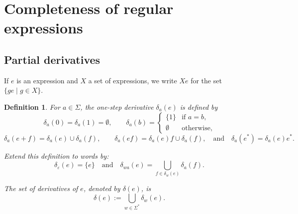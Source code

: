 \documentclass{article}
\newtheorem{definition}{Definition}[section]
\begin{document}
  


\section{Completeness of regular expressions}

\subsection{Partial derivatives}
\begin{notation}
If $e$ is an expression and $X$ a set of expressions, we write $Xe$ for the set $\{ge\mid g\in X\}$.
\end{notation}
 


\begin{definition}
  For $a\in\Sigma$, the one-step derivative $\delta_a(e)$ is defined by
  \[
  \delta_a(0)=\delta_a(1)=\emptyset,\qquad
  \delta_a(b)=
  \begin{cases}
    \{1\} & \text{if }a=b,\\
    \emptyset & \text{otherwise},
  \end{cases}
  \]
  \[
  \delta_a(e+f)=\delta_a(e)\cup\delta_a(f),\qquad
  \delta_a(ef)=\delta_a(e)f\cup \delta_a(f),\quad \text{and} \quad \delta_a(e^*)=\delta_a(e)e^*.
  \]

  \medskip
  Extend this definition to words by:
  \[ \delta_\varepsilon(e)=\{e\} \quad \text{and} \quad
    \delta_{wa}(e)=\bigcup_{f\in\delta_w(e)}\delta_a(f).
  \]
  \medskip

  The set of \emph{derivatives} of $e$, denoted by $\delta(e)$, is
  \[
    \delta(e):=\bigcup_{w\in\Sigma^*}\delta_w(e).
  \]
  \end{definition}
\end{document}
